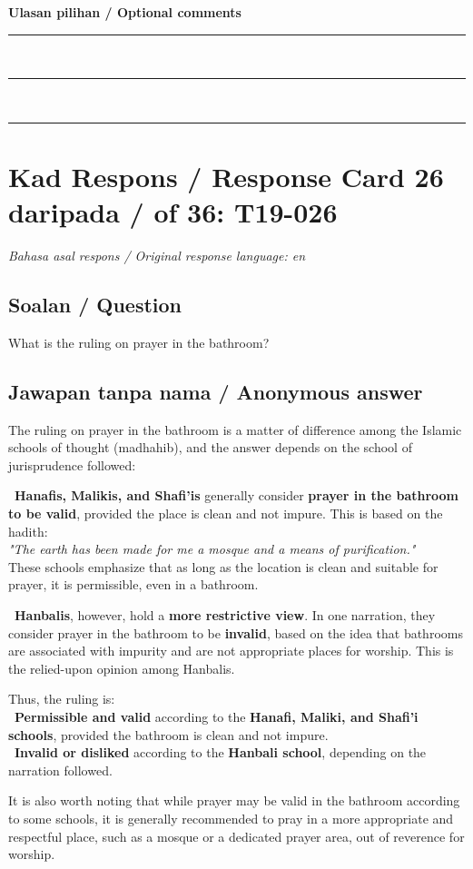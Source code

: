 \documentclass[11pt,a4paper]{article}
\begin{document}
\medskip
\textbf{Ulasan pilihan / Optional comments}\\[3pt]
\rule{\textwidth}{0.4pt}\\[16pt]
\rule{\textwidth}{0.4pt}\\[16pt]
\rule{\textwidth}{0.4pt}

\newpage
\section*{Kad Respons / Response Card 26 daripada / of 36: T19-026}
\textit{Bahasa asal respons / Original response language: en}

\subsection*{Soalan / Question}
What is the ruling on prayer in the bathroom?

\subsection*{Jawapan tanpa nama / Anonymous answer}
The ruling on prayer in the bathroom is a matter of difference among the Islamic schools of thought (madhahib), and the answer depends on the school of jurisprudence followed:\par\medskip \textbullet\ \textbf{Hanafis, Malikis, and Shafi'is} generally consider \textbf{prayer in the bathroom to be valid}, provided the place is clean and not impure. This is based on the hadith:\\ \emph{\emph{"The earth has been made for me a mosque and a means of purification."}}\\ These schools emphasize that as long as the location is clean and suitable for prayer, it is permissible, even in a bathroom.\par\medskip \textbullet\ \textbf{Hanbalis}, however, hold a \textbf{more restrictive view}. In one narration, they consider prayer in the bathroom to be \textbf{invalid}, based on the idea that bathrooms are associated with impurity and are not appropriate places for worship. This is the relied-upon opinion among Hanbalis.\par\medskip Thus, the ruling is:\\ \textbullet\ \textbf{Permissible and valid} according to the \textbf{Hanafi, Maliki, and Shafi'i schools}, provided the bathroom is clean and not impure.\\ \textbullet\ \textbf{Invalid or disliked} according to the \textbf{Hanbali school}, depending on the narration followed.\par\medskip It is also worth noting that while prayer may be valid in the bathroom according to some schools, it is generally recommended to pray in a more appropriate and respectful place, such as a mosque or a dedicated prayer area, out of reverence for worship.
\end{document}
